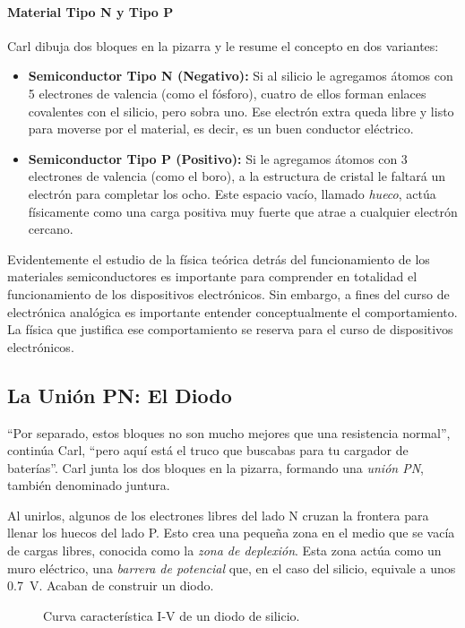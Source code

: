 \paragraph{Material Tipo N y Tipo P}
Carl dibuja dos bloques en la pizarra y le resume el concepto en dos variantes:
\begin{itemize}
    \item \textbf{Semiconductor Tipo N (Negativo):} Si al silicio le agregamos átomos con 5 electrones de valencia (como el fósforo), cuatro de ellos forman enlaces covalentes con el silicio, pero sobra uno. Ese electrón extra queda libre y listo para moverse por el material, es decir, es un buen conductor eléctrico.
    \item \textbf{Semiconductor Tipo P (Positivo):} Si le agregamos átomos con 3 electrones de valencia (como el boro), a la estructura de cristal le faltará un electrón para completar los ocho. Este espacio vacío, llamado \emph{hueco}, actúa físicamente como una carga positiva muy fuerte que atrae a cualquier electrón cercano.
\end{itemize}

Evidentemente el estudio de la física teórica detrás del funcionamiento de los materiales semiconductores es importante para comprender en totalidad el funcionamiento de los dispositivos electrónicos. Sin embargo, a fines del curso de electrónica analógica es importante entender conceptualmente el comportamiento. La física que justifica ese comportamiento se reserva para el curso de dispositivos electrónicos.

\subsection{La Unión PN: El Diodo}

``Por separado, estos bloques no son mucho mejores que una resistencia normal'', continúa Carl, ``pero aquí está el truco que buscabas para tu cargador de baterías''. Carl junta los dos bloques en la pizarra, formando una \emph{unión PN}, también denominado juntura. 

Al unirlos, algunos de los electrones libres del lado N cruzan la frontera para llenar los huecos del lado P. Esto crea una pequeña zona en el medio que se vacía de cargas libres, conocida como la \emph{zona de deplexión}. Esta zona actúa como un muro eléctrico, una \emph{barrera de potencial} que, en el caso del silicio, equivale a unos \qty{0.7}{\volt}. Acaban de construir un diodo.
\begin{figure}[!ht]
  \centering
  
  \caption{Curva característica I-V de un diodo de silicio.}
  \label{fig_curva_del_diodo}
\end{figure}

